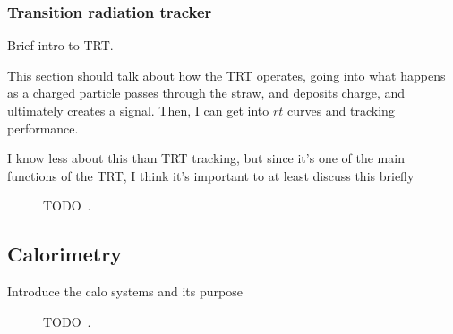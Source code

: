 \FloatBarrier
\subsubsection{Transition radiation tracker} 

{\color{red} Brief intro to TRT. }

{\color{red}This section should talk about how the TRT operates, going into
  what happens as a charged particle passes through the straw, and deposits
  charge, and ultimately creates a signal. Then, I can get into $rt$ curves
  and tracking performance.}

{\color{red}I know less about this than TRT tracking, but since it's one of the
  main functions of the TRT, I think it's important to at least discuss this
    briefly}

\begin{figure}[ht]
  \caption{{\color{red}TODO}~\cite{Maximilien:889555}.}
  \label{fig:trt_module}
\end{figure}

\FloatBarrier
\subsection{Calorimetry} 

{\color{red} Introduce the calo systems and its purpose}

\begin{figure}[ht]
  \caption{{\color{red}TODO}~\cite{cern-jinst-atlas}.}
  \label{fig:calo_cartoon}
\end{figure}


